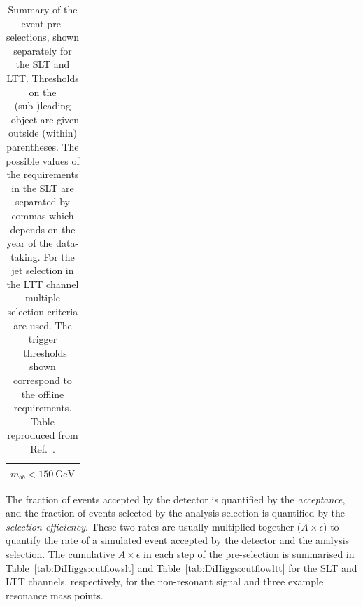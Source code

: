 \begin{table}[htbp]
{\begin{tabular}{C{0.39\textwidth}C{0.39\textwidth}}
   \\
    \bottomrule
    \end{tabular}
    }
    \caption{Summary of the event pre-selections, 
    shown separately for the SLT and LTT. 
   Thresholds on the (sub-)leading \pt\ object are given 
   outside (within) parentheses. 
   The possible values of the requirements in the SLT are separated by commas
   which depends on the year of the data-taking. 
   For the jet selection in the LTT channel multiple selection criteria are used.
   The trigger \pt\ thresholds shown correspond to the offline requirements.
   Table reproduced from Ref.~\cite{dihiggs-conf}.}
   \label{tab:DiHiggs:selectionsummary}
\end{table}


The fraction of events accepted by the detector is quantified by the \textit{acceptance},
and the fraction of events selected by the analysis selection is quantified by 
the \textit{selection efficiency}.
These two rates are usually multiplied together ($A \times \epsilon$) to quantify the rate of a simulated event
accepted by the detector and the analysis selection. 
The cumulative $A \times \epsilon$ in each step of the pre-selection
is summarised in Table~\ref{tab:DiHiggs:cutflowslt}
and Table~\ref{tab:DiHiggs:cutflowltt}
for the SLT and LTT channels, respectively, for the
non-resonant signal and three example resonance mass points.  


